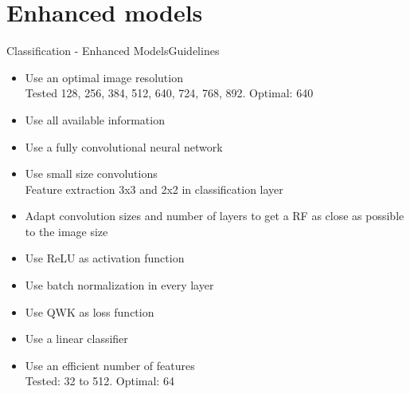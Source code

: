 \documentclass{beamer}
\begin{document}
\section{Enhanced models}

\begin{frame}{Classification - Enhanced Models}{Guidelines}
\begin{itemize}
	\item Use an optimal image resolution \\Tested 128, 256, 384, 512, 640, 724, 768, 892. Optimal: 640
	\item Use all available information
	\item Use a fully convolutional neural network
	\item Use small size convolutions \\Feature extraction 3x3 and 2x2 in classification layer
	\item Adapt convolution sizes and number of layers to get a RF as close as possible to the image size
	\item Use ReLU as activation function
	\item Use batch normalization in every layer
	\item Use QWK as loss function
	\item Use a linear classifier
	\item Use an efficient number of features \\Tested: 32 to 512. Optimal: 64
\end{itemize}
\end{frame}
\end{document}
